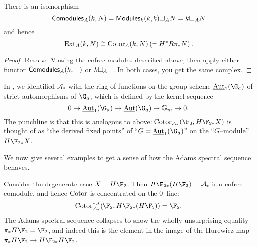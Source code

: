 \begin{corollary}\label{ExtAndCotorAgree}
There is an isomorphism \[\mathsf{Comodules}_A(k, N) = \mathsf{Modules}_k(k, k) \square_A N = k \square_A N\] and hence \[\operatorname{Ext}_A(k, N) \cong \operatorname{Cotor}_A(k, N) \left(= H^* R\pi_* N\right).\]
\end{corollary}
\begin{proof}
Resolve $N$ using the cofree modules described above, then apply either functor $\mathsf{Comodules}_A(k, -)$ or $k \square_A -$.  In both cases, you get the same complex.
\end{proof}

\begin{example}\label{HF2HomologyIsValuedInAutGaEquivarModules}
In , we identified $\mathcal A_*$ with the ring of functions on the group scheme $\InternalAut_1(\G_a)$ of strict automorphisms of $\G_a$, which is defined by the kernel sequence \[0 \to \InternalAut_1(\G_a) \to \InternalAut(\G_a) \to \Gm \to 0.\]  The punchline is that this is analogous to  above: $\Cotor_{\mathcal A_*}(\F_2, H\F_{2*} X)$ is thought of as ``the derived fixed points'' of ``$G = \InternalAut_1(\G_a)$'' on the ``$G$--module'' $H\F_{2*} X$.
\end{example}

We now give several examples to get a sense of how the Adams spectral sequence behaves.

\begin{example}
Consider the degenerate case $X = H\F_2$.  Then $H\F_{2*}(H\F_2) = \mathcal A_*$ is a cofree comodule, and hence $\operatorname{Cotor}$ is concentrated on the $0$--line: \[\Cotor_{\mathcal A_*}^{*, *}(\F_2, H\F_{2*}(H\F_2)) = \F_2.\]  The Adams spectral sequence collapses to show the wholly unsurprising equality $\pi_* H\F_2 = \F_2$, and indeed this is the element in the image of the Hurewicz map $\pi_* H\F_2 \to H\F_{2*} H\F_2$.
\end{example}

